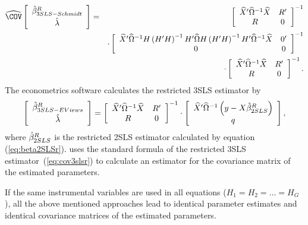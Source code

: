 \begin{eqnarray}
   \COVHat
   \left[ \begin{array}{c}
      \bHat^R_{3SLS-Schmidt} \\[0.2em] \lHat
   \end{array} \right] 
   & = & 
   \left[ \begin{array}{cc}
      \XHat' \OHat^{-1} \XHat & R' \\
      R & 0
   \end{array} \right]^{-1}
   \\
   & & \cdot
   \left[ \begin{array}{cc}
      \XHat' \OHat^{-1} H \left( H' H \right)^{-1} H' \OHat
      H \left( H' H \right)^{-1} H' \OHat^{-1} \XHat & 0' \\
      0 & 0
   \end{array} \right]^{-1}
   \nonumber \\
   & & \cdot
   \left[ \begin{array}{cc}
      \XHat' \OHat^{-1} \XHat & R' \\
      R & 0
   \end{array} \right]^{-1} .
   \nonumber
\end{eqnarray}
The econometrics software  calculates the restricted 3SLS estimator by
\begin{equation}
   \left[ \begin{array}{c}
      \hat{\beta}^R_{3SLS-EViews} \\[0.2em] \hat{\lambda}
   \end{array} \right]
   =
   \left[ \begin{array}{cc}
      \widehat{X}' \widehat{\Omega}^{-1} \widehat{X} & R' \\
      R & 0
   \end{array} \right]^{-1}
   \cdot
   \left[ \begin{array}{c}
      \widehat{X}' \widehat{\Omega}^{-1} \left( y - X \hat{\beta}^R_{2SLS} \right)
      \\ q 
   \end{array} \right] ,
   \label{eq:3slsEViewsR}
\end{equation}
where $\hat{\beta}^R_{2SLS}$ is the restricted 2SLS estimator calculated
by equation (\ref{eq:beta2SLSr}). 
 uses the standard formula of the restricted 3SLS
estimator~(\ref{eq:cov3slsr}) to calculate an estimator
for the covariance matrix of the estimated parameters.


If the same instrumental variables are used in all equations 
($H_1 = H_2 = \ldots = H_G$), 
all the above mentioned approaches lead to identical parameter estimates
and identical covariance matrices of the estimated parameters.

